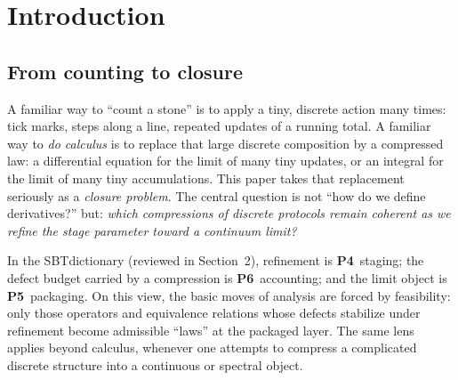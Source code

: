 \documentclass[apajournal,article,submit,moreauthors,pdftex]{Definitions/mdpi}
\newcommand{\SBT}{\textsc{SBT}}
\newcommand{\Pfour}{\textbf{P4}}
\newcommand{\Pfive}{\textbf{P5}}
\newcommand{\Psix}{\textbf{P6}}
\begin{document}
\newcommand{\HolonomyExponent}{\ensuremath{1.46381}}
\newcommand{\StencilGeneratedTotal}{\ensuremath{1000}}
\newcommand{\StencilSurvivorsTotal}{\ensuremath{913}}
\newcommand{\StencilLeibnizSurvivorsTotal}{\ensuremath{50}}
\newcommand{\StencilNZero}{\ensuremath{64}}
\newcommand{\StencilMLeibniz}{\ensuremath{3}}
\newcommand{\StencilGateDTwo}{\ensuremath{0.2}}
\newcommand{\StencilGateRatio}{\ensuremath{0.85}}
\newcommand{\PrimeRMConvAtEightHundred}{\ensuremath{0.0523991}}
\newcommand{\PrimeRMStripAtEightHundred}{\ensuremath{5.00808\times 10^{12}}}
\newcommand{\HolonomyFitRtwo}{\ensuremath{0.987808}}
\newcommand{\HolonomyNullRMMax}{\ensuremath{0}}
\newcommand{\PrimeDPS}{\ensuremath{50}}
\newcommand{\PassivityN}{\ensuremath{12}}
\newcommand{\PrimeNList}{\ensuremath{\{50,100,200,400,800\}}}
\newcommand{\PrimeSigmaConvList}{\ensuremath{\{1.25,1.5\}}}
\newcommand{\PrimeSigmaStripList}{\ensuremath{\{0.75,0.5\}}}
\newcommand{\PrimeTList}{\ensuremath{\{0,2,4,6\}}}
\newcommand{\PassivityMeanDevLamOne}{\ensuremath{0.871694}}
\newcommand{\PassivityMeanDevLamZero}{\ensuremath{3.0292\times 10^{-4}}}
\newcommand{\IntegrationRMAtSmallestH}{\ensuremath{0.00177129}}
\newcommand{\IntegrationRMExponent}{\ensuremath{1.00009}}
\newcommand{\IntegrationFTExponent}{\ensuremath{0.499955}}
\newcommand{\IntegrationFitRtwo}{\ensuremath{1}}
 
\section{Introduction}
\label{sec:introduction}

\subsection{From counting to closure}
A familiar way to ``count a stone'' is to apply a tiny, discrete action many times: tick marks, steps along a line, repeated updates of a running total.
A familiar way to \emph{do calculus} is to replace that large discrete composition by a compressed law: a differential equation for the limit of many tiny updates, or an integral for the limit of many tiny accumulations.
This paper takes that replacement seriously as a \emph{closure problem}.
The central question is not ``how do we define derivatives?'' but:
\emph{which compressions of discrete protocols remain coherent as we refine the stage parameter toward a continuum limit?}

In the \SBT dictionary (reviewed in Section~2), refinement is \Pfour\ staging; the defect budget carried by a compression is \Psix\ accounting; and the limit object is \Pfive\ packaging.
On this view, the basic moves of analysis are forced by feasibility: only those operators and equivalence relations whose defects stabilize under refinement become admissible ``laws'' at the packaged layer.
The same lens applies beyond calculus, whenever one attempts to compress a complicated discrete structure into a continuous or spectral object.
\end{document}
